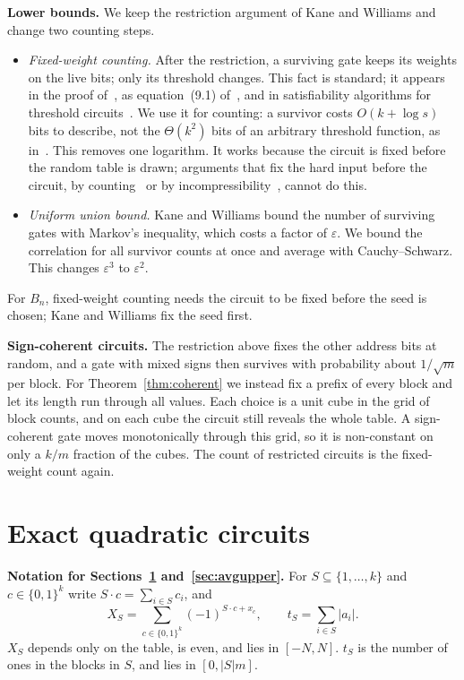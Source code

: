 \documentclass[11pt,letterpaper]{article}
\theoremstyle{remark}
\newcommand{\bits}{\{0,1\}}
\newcommand{\sect}[1]{\section{\texorpdfstring{\color{ink}#1}{#1}}}
\newcommand{\smalltitle}[1]{\textbf{\color{ink}#1}\quad}
\begin{document}
\smalltitle{Lower bounds.}
We keep the restriction argument of Kane and Williams and change two counting
steps.
\begin{itemize}
\item \emph{Fixed-weight counting.} After the restriction, a surviving gate
      keeps its weights on the live bits; only its threshold changes. This
      fact is standard; it appears in the proof of~\cite[Lemma~1.1]{KW}, as
      equation~(9.1) of~\cite{CSS}, and in satisfiability algorithms for
      threshold circuits~\cite{CTW}. We use it for counting: a survivor costs
      $O(k+\log s)$ bits to describe, not the $\Theta(k^2)$ bits of an
      arbitrary threshold function, as in~\cite{KW,KKL,CSS}. This removes one
      logarithm. It works because the circuit is fixed before the random table
      is drawn; arguments that fix the hard input before the circuit, by
      counting~\cite{KW,CSS} or by incompressibility~\cite{KKL}, cannot do
      this.
\item \emph{Uniform union bound.} Kane and Williams bound the number of
      surviving gates with Markov's inequality, which costs a factor of
      $\varepsilon$. We bound the correlation for all survivor counts at
      once and average with Cauchy--Schwarz. This changes $\varepsilon^3$
      to $\varepsilon^2$.
\end{itemize}
For $B_n$, fixed-weight counting needs the circuit to be fixed before the
seed is chosen; Kane and Williams fix the seed first.

\smalltitle{Sign-coherent circuits.}
The restriction above fixes the other address bits at random, and a gate with
mixed signs then survives with probability about $1/\sqrt m$ per block. For
Theorem~\ref{thm:coherent} we instead fix a prefix of every block and let its
length run through all values. Each choice is a unit cube in the grid of
block counts, and on each cube the circuit still reveals the whole table. A
sign-coherent gate moves monotonically through this grid, so it is
non-constant on only a $k/m$ fraction of the cubes. The count of restricted
circuits is the fixed-weight count again.

\sect{Exact quadratic circuits}\label{sec:upper}

\begin{keybox}
\textbf{Notation for Sections~\ref{sec:upper} and~\ref{sec:avgupper}.}
For $S\subseteq\{1,\dots,k\}$ and $c\in\bits^k$ write $S\cdot c=\sum_{i\in S}c_i$, and
\[
X_S=\sum_{c\in\bits^k}(-1)^{S\cdot c+x_c},\qquad
t_S=\sum_{i\in S}|a_i| .
\]
$X_S$ depends only on the table, is even, and lies in $[-N,N]$.
$t_S$ is the number of ones in the blocks in $S$, and lies in $[0,|S|m]$.
\end{keybox}
\end{document}
